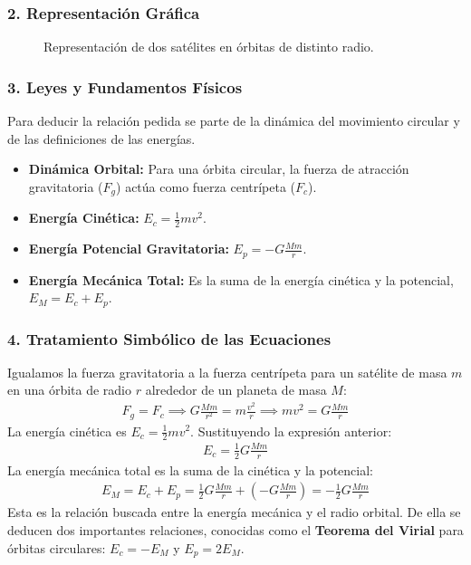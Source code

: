 \subsubsection*{2. Representación Gráfica}
\begin{figure}[H]
    \centering
    \caption{Representación de dos satélites en órbitas de distinto radio.}
\end{figure}

\subsubsection*{3. Leyes y Fundamentos Físicos}
Para deducir la relación pedida se parte de la dinámica del movimiento circular y de las definiciones de las energías.
\begin{itemize}
    \item \textbf{Dinámica Orbital:} Para una órbita circular, la fuerza de atracción gravitatoria ($F_g$) actúa como fuerza centrípeta ($F_c$).
    \item \textbf{Energía Cinética:} $E_c = \frac{1}{2}mv^2$.
    \item \textbf{Energía Potencial Gravitatoria:} $E_p = -G\frac{Mm}{r}$.
    \item \textbf{Energía Mecánica Total:} Es la suma de la energía cinética y la potencial, $E_M = E_c + E_p$.
\end{itemize}

\subsubsection*{4. Tratamiento Simbólico de las Ecuaciones}
Igualamos la fuerza gravitatoria a la fuerza centrípeta para un satélite de masa $m$ en una órbita de radio $r$ alrededor de un planeta de masa $M$:
\begin{gather}
    F_g = F_c \implies G\frac{Mm}{r^2} = m\frac{v^2}{r} \implies mv^2 = G\frac{Mm}{r}
\end{gather}
La energía cinética es $E_c = \frac{1}{2}mv^2$. Sustituyendo la expresión anterior:
\begin{gather}
    E_c = \frac{1}{2} G\frac{Mm}{r}
\end{gather}
La energía mecánica total es la suma de la cinética y la potencial:
\begin{gather}
    E_M = E_c + E_p = \frac{1}{2} G\frac{Mm}{r} + \left(-G\frac{Mm}{r}\right) = -\frac{1}{2} G\frac{Mm}{r}
\end{gather}
Esta es la relación buscada entre la energía mecánica y el radio orbital. De ella se deducen dos importantes relaciones, conocidas como el \textbf{Teorema del Virial} para órbitas circulares: $E_c = -E_M$ y $E_p = 2E_M$.


